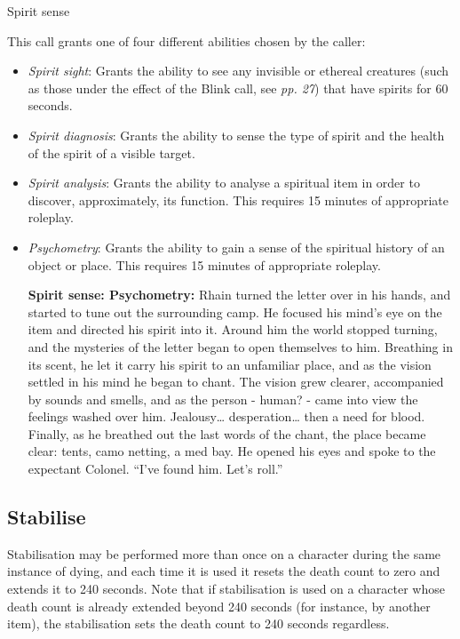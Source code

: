 \documentclass{scrbook}
\begin{document}
Spirit sense

This call grants one of four different abilities chosen by the caller:

\begin{itemize}
\item \textit{Spirit sight}: Grants the ability to see any invisible or ethereal creatures (such as those under the effect of the Blink call, see \textit{pp. 27}) that have spirits for 60 seconds.

\item \textit{Spirit diagnosis}: Grants the ability to sense the type of spirit and the health of the spirit of a visible target.

\item \textit{Spirit analysis}: Grants the ability to analyse a spiritual item in order to discover, approximately, its function. This requires 15 minutes of appropriate roleplay.

\item \textit{Psychometry}: Grants the ability to gain a sense of the spiritual history of an object or place. This requires 15 minutes of appropriate roleplay.

\textbf{Spirit sense: Psychometry:} Rhain turned the letter over in his hands, and started to tune out the surrounding camp. He focused his mind's eye on the item and directed his spirit into it. Around him the world stopped turning, and the mysteries of the letter began to open themselves to him. Breathing in its scent, he let it carry his spirit to an unfamiliar place, and as the vision settled in his mind he began to chant. The vision grew clearer, accompanied by sounds and smells, and as the person - human? - came into view the feelings washed over him. Jealousy{\dots} desperation{\dots} then a need for blood. Finally, as he breathed out the last words of the chant, the place became clear: tents, camo netting, a med bay. He opened his eyes and spoke to the expectant Colonel. ``I've found him. Let's roll.''

\end{itemize}

\subsection{Stabilise}

Stabilisation may be performed more than once on a character during the same instance of dying, and each time it is used it resets the death count to zero and extends it to 240 seconds. Note that if stabilisation is used on a character whose death count is already extended beyond 240 seconds (for instance, by another item), the stabilisation sets the death count to 240 seconds regardless.
\end{document}
